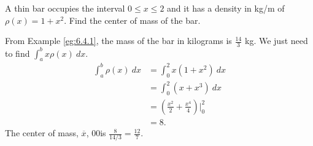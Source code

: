 \begin{example} \label{eg:6.4.2} %
A thin bar occupies the interval $0 \leq x \leq 2$ and it has a density in kg/m of $\rho(x) = 1+ x^2$. Find the center of mass of the bar. 

\solution
From Example \ref{eg:6.4.1}, the mass of the bar in kilograms is $\frac{14}{3}$ kg. We just need to find $\int_a^b x \rho(x) \ dx$.
\begin{align*}
	\int_a^b \rho(x) \ dx  & = 	\int_0^2 x (1+x^2) \ dx \\
		&= \int_0^2 (x +x^3) \ dx \\
		&= 	\left(\frac{x^2}{2}+\frac{x^4}{4} \right) \Big|_0^2 \\
		&= 8.
\end{align*}
The center of mass, $\overline{x}$, 00is $\frac{8}{14/3} = \frac{12}{7}$. 

\end{example}


